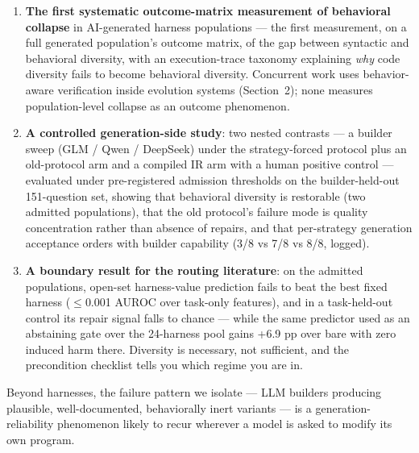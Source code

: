 \begin{enumerate}
\def\labelenumi{\arabic{enumi}.}
\tightlist
\item
  \textbf{The first systematic outcome-matrix measurement of behavioral
  collapse} in AI-generated harness populations --- the first
  measurement, on a full generated population's outcome matrix, of the
  gap between syntactic and behavioral diversity, with an
  execution-trace taxonomy explaining \emph{why} code diversity fails to
  become behavioral diversity. Concurrent work uses behavior-aware
  verification inside evolution systems (Section~2); none measures
  population-level collapse as an outcome phenomenon.
\item
  \textbf{A controlled generation-side study}: two nested contrasts ---
  a builder sweep (GLM / Qwen / DeepSeek) under the strategy-forced
  protocol plus an old-protocol arm and a compiled IR arm with a human
  positive control --- evaluated under pre-registered admission
  thresholds on the builder-held-out 151-question set, showing that
  behavioral diversity is restorable (two admitted populations), that
  the old protocol's failure mode is quality concentration rather than
  absence of repairs, and that per-strategy generation acceptance orders
  with builder capability (3/8 vs 7/8 vs 8/8, logged).
\item
  \textbf{A boundary result for the routing literature}: on the admitted
  populations, open-set harness-value prediction fails to beat the best
  fixed harness ($\leq$0.001 AUROC over task-only features), and in a
  task-held-out control its repair signal falls to chance --- while the
  same predictor used as an abstaining gate over the 24-harness pool
  gains +6.9 pp over bare with zero induced harm there. Diversity is
  necessary, not sufficient, and the precondition checklist tells you
  which regime you are in.
\end{enumerate}

Beyond harnesses, the failure pattern we isolate --- LLM builders
producing plausible, well-documented, behaviorally inert variants --- is
a generation-reliability phenomenon likely to recur wherever a model is
asked to modify its own program.
